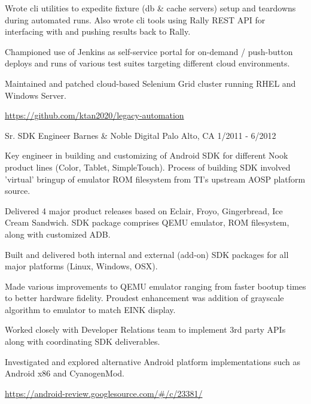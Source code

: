 \documentclass[11pt, a4paper]{awesome-cv}
\begin{document}
\begin{cventries}
{\begin{cvitems}
        \item {Wrote cli utilities to expedite fixture (db \& cache servers) setup and teardowns during automated runs. Also wrote cli tools using Rally REST API for interfacing with and pushing results back to Rally.}
        \item {Championed use of Jenkins as self-service portal for on-demand / push-button deploys and runs of various test suites targeting different cloud environments.}
        \item {Maintained and patched cloud-based Selenium Grid cluster running RHEL and Windows Server.}
		\item {\href{https://github.com/ktan2020/legacy-automation}{https://github.com/ktan2020/legacy-automation}}
      \end{cvitems}
    }

  \cventry
    {Sr. SDK Engineer} %
    {Barnes \& Noble Digital} %
    {Palo Alto, CA} %
    {1/2011 - 6/2012} %
    {
      \begin{cvitems} %
        \item {Key engineer in building and customizing of Android SDK for different Nook product lines (Color, Tablet, SimpleTouch). Process of building SDK involved 'virtual' bringup of emulator ROM filesystem from TI's upstream AOSP platform source.}
        \item {Delivered 4 major product releases based on Eclair, Froyo, Gingerbread, Ice Cream Sandwich. SDK package comprises QEMU emulator, ROM filesystem, along with customized ADB.}
        \item {Built and delivered both internal and external (add-on) SDK packages for all major platforms (Linux, Windows, OSX).}
        \item {Made various improvements to QEMU emulator ranging from faster bootup times to better hardware fidelity. Proudest enhancement was addition of grayscale algorithm to emulator to match EINK display.}
        \item {Worked closely with Developer Relations team to implement 3rd party APIs along with coordinating SDK deliverables.}
        \item {Investigated and explored alternative Android platform implementations such as Android x86 and CyanogenMod.} 
        \item {\href{https://android-review.googlesource.com/\#/c/23381/}{https://android-review.googlesource.com/\#/c/23381/}}
      \end{cvitems}
    }


\end{cventries}
\end{document}
